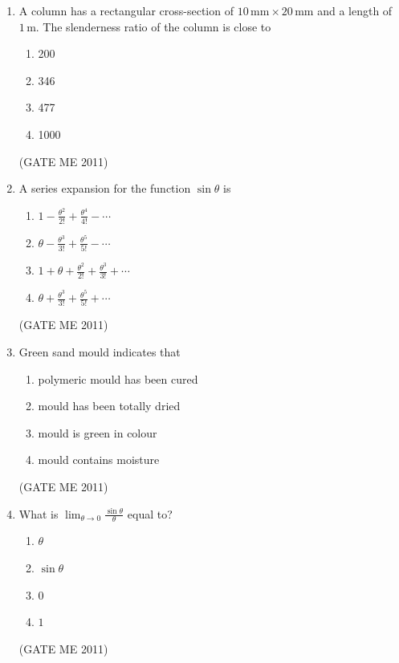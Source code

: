 \documentclass[journal]{IEEEtran}
\begin{document}
\begin{enumerate}
\item A column has a rectangular cross-section of $10\,\text{mm} \times 20\,\text{mm}$ and a length of $1\,\text{m}$. The slenderness ratio of the column is close to
\begin{multicols}{4}
\begin{enumerate}
\item 200  
\item 346  
\item 477  
\item 1000  
\end{enumerate}
\end{multicols}   
\hfill (GATE ME 2011)               

\item A series expansion for the function $\sin \theta$ is
\begin{multicols}{2}
\begin{enumerate}
\item $ 1 - \frac{\theta^2}{2!} + \frac{\theta^4}{4!} - \cdots $
\item $ \theta - \frac{\theta^3}{3!} + \frac{\theta^5}{5!} - \cdots $
\item $ 1 + \theta + \frac{\theta^2}{2!} + \frac{\theta^3}{3!} + \cdots $
\item $ \theta + \frac{\theta^3}{3!} + \frac{\theta^5}{5!} + \cdots $
\end{enumerate}
\end{multicols}    
\hfill (GATE ME 2011)  

\item Green sand mould indicates that
\begin{multicols}{2}
\begin{enumerate}
\item polymeric mould has been cured  
\item mould has been totally dried  
\item mould is green in colour  
\item mould contains moisture  
\end{enumerate}
\end{multicols}    
\hfill (GATE ME 2011)  

\item What is $\lim_{\theta \to 0} \frac{\sin \theta}{\theta}$ equal to?
\begin{multicols}{4}
\begin{enumerate}
\item $\theta$  
\item $\sin \theta$  
\item $0$  
\item $1$  
\end{enumerate}
\end{multicols}    
\hfill (GATE ME 2011)  


\end{enumerate}
\end{document}
